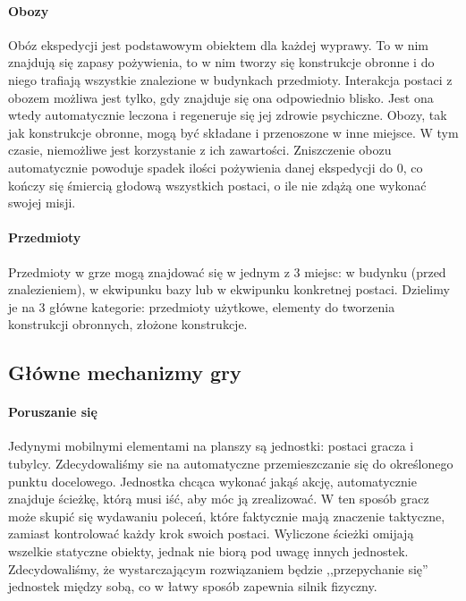 \documentclass[licencjacka]{pracamgr}
\begin{document}
    \paragraph{Obozy}
      Obóz ekspedycji jest podstawowym obiektem dla każdej wyprawy. To w nim znajdują się zapasy pożywienia, to w nim tworzy
      się konstrukcje obronne i do niego trafiają wszystkie znalezione w budynkach przedmioty. Interakcja postaci z obozem
      możliwa jest tylko, gdy znajduje się ona odpowiednio blisko. Jest ona wtedy automatycznie leczona i regeneruje się
      jej zdrowie psychiczne. Obozy, tak jak konstrukcje obronne, mogą być składane i przenoszone w inne miejsce. W tym czasie,
      niemożliwe jest korzystanie z ich zawartości. Zniszczenie obozu automatycznie powoduje spadek ilości pożywienia danej
      ekspedycji do 0, co kończy się śmiercią głodową wszystkich postaci, o ile nie zdążą one wykonać swojej misji.
    \paragraph{Przedmioty}
      Przedmioty w grze mogą znajdować się w jednym z 3 miejsc: w budynku (przed znalezieniem), w ekwipunku bazy lub w
      ekwipunku konkretnej postaci. Dzielimy je na 3 główne kategorie: przedmioty użytkowe, elementy do tworzenia konstrukcji
      obronnych, złożone konstrukcje.

    \subsection{Główne mechanizmy gry}
    \paragraph{Poruszanie się}
      Jedynymi mobilnymi elementami na planszy są jednostki: postaci gracza i tubylcy. Zdecydowaliśmy sie na automatyczne
      przemieszczanie się do określonego punktu docelowego. Jednostka chcąca wykonać jakąś akcję, automatycznie znajduje
      ścieżkę, którą musi iść, aby móc ją zrealizować. W ten sposób gracz może skupić się wydawaniu poleceń, które faktycznie mają
      znaczenie taktyczne, zamiast kontrolować każdy krok swoich postaci. Wyliczone ścieżki omijają wszelkie statyczne obiekty, jednak
      nie biorą pod uwagę innych jednostek. Zdecydowaliśmy, że wystarczającym rozwiązaniem będzie ,,przepychanie się'' jednostek między sobą,
      co w łatwy sposób zapewnia silnik fizyczny.
\end{document}
